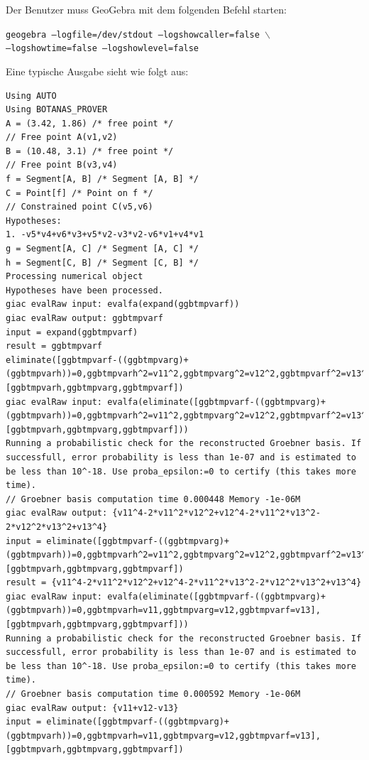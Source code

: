 \documentclass{article}
\begin{document}
Der Benutzer muss GeoGebra mit dem folgenden Befehl starten:
{
    \begin{center}
        \texttt{geogebra --logfile=/dev/stdout --logshowcaller=false $\backslash$\\ --logshowtime=false --logshowlevel=false} 
    \end{center}
} %
Eine typische Ausgabe sieht wie folgt aus:
\vfill\eject %
{
\scriptsize
\begin{lstlisting}[language=mylog]
Using AUTO
Using BOTANAS_PROVER
A = (3.42, 1.86) /* free point */
// Free point A(v1,v2)
B = (10.48, 3.1) /* free point */
// Free point B(v3,v4)
f = Segment[A, B] /* Segment [A, B] */
C = Point[f] /* Point on f */
// Constrained point C(v5,v6)
Hypotheses:
1. -v5*v4+v6*v3+v5*v2-v3*v2-v6*v1+v4*v1
g = Segment[A, C] /* Segment [A, C] */
h = Segment[C, B] /* Segment [C, B] */
Processing numerical object
Hypotheses have been processed.
giac evalRaw input: evalfa(expand(ggbtmpvarf))
giac evalRaw output: ggbtmpvarf
input = expand(ggbtmpvarf)
result = ggbtmpvarf
eliminate([ggbtmpvarf-((ggbtmpvarg)+(ggbtmpvarh))=0,ggbtmpvarh^2=v11^2,ggbtmpvarg^2=v12^2,ggbtmpvarf^2=v13^2],[ggbtmpvarh,ggbtmpvarg,ggbtmpvarf])
giac evalRaw input: evalfa(eliminate([ggbtmpvarf-((ggbtmpvarg)+(ggbtmpvarh))=0,ggbtmpvarh^2=v11^2,ggbtmpvarg^2=v12^2,ggbtmpvarf^2=v13^2],[ggbtmpvarh,ggbtmpvarg,ggbtmpvarf]))
Running a probabilistic check for the reconstructed Groebner basis. If successfull, error probability is less than 1e-07 and is estimated to be less than 10^-18. Use proba_epsilon:=0 to certify (this takes more time).
// Groebner basis computation time 0.000448 Memory -1e-06M
giac evalRaw output: {v11^4-2*v11^2*v12^2+v12^4-2*v11^2*v13^2-2*v12^2*v13^2+v13^4}
input = eliminate([ggbtmpvarf-((ggbtmpvarg)+(ggbtmpvarh))=0,ggbtmpvarh^2=v11^2,ggbtmpvarg^2=v12^2,ggbtmpvarf^2=v13^2],[ggbtmpvarh,ggbtmpvarg,ggbtmpvarf])
result = {v11^4-2*v11^2*v12^2+v12^4-2*v11^2*v13^2-2*v12^2*v13^2+v13^4}
giac evalRaw input: evalfa(eliminate([ggbtmpvarf-((ggbtmpvarg)+(ggbtmpvarh))=0,ggbtmpvarh=v11,ggbtmpvarg=v12,ggbtmpvarf=v13],[ggbtmpvarh,ggbtmpvarg,ggbtmpvarf]))
Running a probabilistic check for the reconstructed Groebner basis. If successfull, error probability is less than 1e-07 and is estimated to be less than 10^-18. Use proba_epsilon:=0 to certify (this takes more time).
// Groebner basis computation time 0.000592 Memory -1e-06M
giac evalRaw output: {v11+v12-v13}
input = eliminate([ggbtmpvarf-((ggbtmpvarg)+(ggbtmpvarh))=0,ggbtmpvarh=v11,ggbtmpvarg=v12,ggbtmpvarf=v13],[ggbtmpvarh,ggbtmpvarg,ggbtmpvarf])

\end{lstlisting}}
\end{document}
